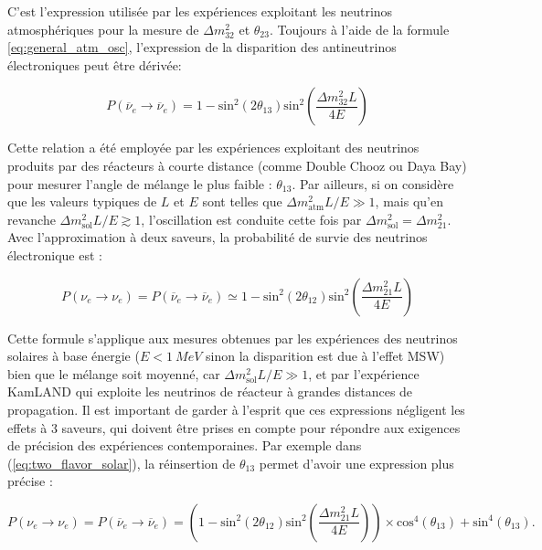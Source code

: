 \bigbreak

C'est l'expression utilisée par les expériences exploitant les neutrinos atmosphériques pour la mesure de $\Delta m^2_{32}$ et $\theta_{23}$. Toujours à l'aide de la formule \ref{eq:general_atm_osc}, l'expression de la disparition des antineutrinos électroniques peut être dérivée:

\begin{equation}
    P(\overline{\nu}_e \rightarrow \overline{\nu}_e) = 1 - \textrm{sin}^2\left(2 \theta_{13} \right) \textrm{sin}^2\left(\frac{\Delta m^2_{32} L}{4E} \right)
\end{equation}

\bigbreak

Cette relation a été employée par les expériences exploitant des neutrinos produits par des réacteurs à courte distance (comme Double Chooz ou Daya Bay) pour mesurer l'angle de mélange le plus faible : $\theta_{13}$. Par ailleurs, si on considère que les valeurs typiques de $L$ et $E$ sont telles que $\Delta m^2_\textrm{atm} L/E \gg 1$, mais qu'en revanche $\Delta m^2_\textrm{sol} L/E \gtrsim 1 $, l'oscillation est conduite cette fois par $\Delta m^2_\textrm{sol} = \Delta m^2_{21}$. Avec l'approximation à deux saveurs, la probabilité de survie des neutrinos électronique est :

\begin{equation}
\label{eq:two_flavor_solar}
    P(\nu_e \rightarrow \nu_e) = P(\overline{\nu}_e \rightarrow \overline{\nu}_e) \simeq 1 - \textrm{sin}^2\left(2 \theta_{12} \right) \textrm{sin}^2\left(\frac{\Delta m^2_{21} L}{4E} \right)
\end{equation}

\bigbreak

Cette formule s'applique aux mesures obtenues par les expériences des neutrinos solaires à base énergie ($E < \SI{1}{MeV}$ sinon la disparition est due à l'effet MSW) bien que le mélange soit moyenné, car $\Delta m^2_\textrm{sol} L/E \gg 1 $, et par l'expérience KamLAND qui exploite les neutrinos de réacteur à grandes distances de propagation. Il est important de garder à l'esprit que ces expressions négligent les effets à 3 saveurs, qui doivent être prises en compte pour répondre aux exigences de précision des expériences contemporaines. Par exemple dans (\ref{eq:two_flavor_solar}), la réinsertion de $\theta_{13}$ permet d'avoir une expression plus précise :

\begin{equation}
    P(\nu_e \rightarrow \nu_e) = P(\overline{\nu}_e \rightarrow \overline{\nu}_e) = \left(1 - \textrm{sin}^2\left(2 \theta_{12} \right) \textrm{sin}^2\left(\frac{\Delta m^2_{21} L}{4E} \right)\right) \times \textrm{cos}^4\left(\theta_{13}\right) + \textrm{sin}^4\left(\theta_{13}\right).
\end{equation}

